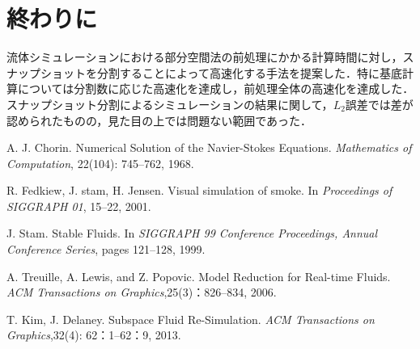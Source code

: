 \documentclass[uplatex,dvipdfmx,10pt,a4paper,notitlepage,oneside,twocolumn]{abst_jsarticle}
\begin{document}
\section{終わりに}
流体シミュレーションにおける部分空間法の前処理にかかる計算時間に対し，スナップショットを分割することによって高速化する手法を提案した．特に基底計算については分割数に応じた高速化を達成し，前処理全体の高速化を達成した．スナップショット分割によるシミュレーションの結果に関して，$L_2$誤差では差が認められたものの，見た目の上では問題ない範囲であった．
\begin{thebibliography}{99}

A. J. Chorin. Numerical Solution of the Navier-Stokes Equations. \textit{Mathematics of Computation}, 22(104): 745--762, 1968.

R. Fedkiew, J. stam, H. Jensen. Visual simulation of smoke. In \textit{Proceedings of SIGGRAPH 01}, 15--22, 2001.

J. Stam. Stable Fluids. In \textit{SIGGRAPH 99 Conference Proceedings, Annual Conference Series}, pages 121--128, 1999.

A. Treuille, A. Lewis, and Z. Popovic. Model Reduction for Real-time Fluids. \textit{ACM Transactions on Graphics},25(3)：826--834, 2006.

T. Kim, J. Delaney. Subspace Fluid Re-Simulation. \textit{ACM Transactions on Graphics},32(4): 62：1--62：9, 2013.

\end{thebibliography}
\end{document}
